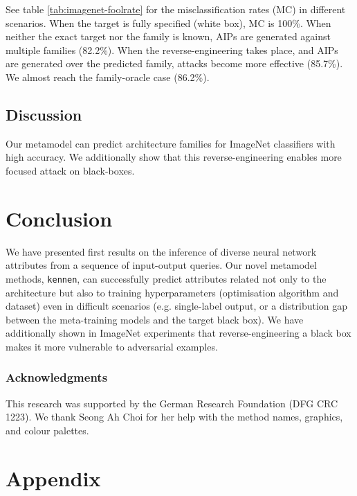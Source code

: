 \documentclass{article} %
\newcommand{\kennen}{\texttt{kennen}\xspace}
\begin{document}
See table \ref{tab:imagenet-foolrate} for the misclassification rates (MC) in different scenarios. When the target is fully specified (white box), MC is 100\%. When neither the exact target nor the family is known, AIPs are generated against multiple families (82.2\%). When the reverse-engineering takes place, and AIPs are generated over the predicted family, attacks become more effective (85.7\%). We almost reach the family-oracle case (86.2\%).

\subsection{Discussion}
Our metamodel can predict architecture families for ImageNet classifiers with high accuracy. We additionally show that this reverse-engineering enables more focused attack on black-boxes.

\section{Conclusion}

We have presented first results on the inference of diverse neural network attributes from a sequence of input-output queries. Our novel metamodel methods, \kennen, can successfully predict attributes related not only to the architecture but also to training hyperparameters (optimisation algorithm and dataset) even in difficult scenarios (e.g. single-label output, or a distribution gap between the meta-training models and the target black box). We have additionally shown in ImageNet experiments that reverse-engineering a black box makes it more vulnerable to adversarial examples.

\subsubsection*{Acknowledgments}

This research was supported by the German Research Foundation (DFG CRC 1223). We thank Seong Ah Choi for her help with the method names, graphics, and colour palettes. 




\FloatBarrier
\newpage



\appendix

\section*{Appendix}
\end{document}
